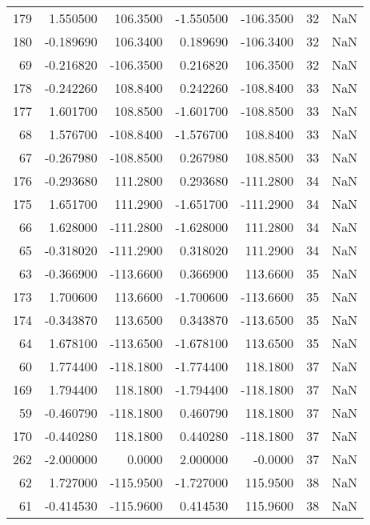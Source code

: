 \begin{tabular}{rrrrrrr}
179 &    1.550500 &  106.3500 &   -1.550500 &   -106.3500 &          32 & NaN \\
180 &   -0.189690 &  106.3400 &    0.189690 &   -106.3400 &          32 & NaN \\
 69 &   -0.216820 & -106.3500 &    0.216820 &    106.3500 &          32 & NaN \\
178 &   -0.242260 &  108.8400 &    0.242260 &   -108.8400 &          33 & NaN \\
177 &    1.601700 &  108.8500 &   -1.601700 &   -108.8500 &          33 & NaN \\
 68 &    1.576700 & -108.8400 &   -1.576700 &    108.8400 &          33 & NaN \\
 67 &   -0.267980 & -108.8500 &    0.267980 &    108.8500 &          33 & NaN \\
176 &   -0.293680 &  111.2800 &    0.293680 &   -111.2800 &          34 & NaN \\
175 &    1.651700 &  111.2900 &   -1.651700 &   -111.2900 &          34 & NaN \\
 66 &    1.628000 & -111.2800 &   -1.628000 &    111.2800 &          34 & NaN \\
 65 &   -0.318020 & -111.2900 &    0.318020 &    111.2900 &          34 & NaN \\
 63 &   -0.366900 & -113.6600 &    0.366900 &    113.6600 &          35 & NaN \\
173 &    1.700600 &  113.6600 &   -1.700600 &   -113.6600 &          35 & NaN \\
174 &   -0.343870 &  113.6500 &    0.343870 &   -113.6500 &          35 & NaN \\
 64 &    1.678100 & -113.6500 &   -1.678100 &    113.6500 &          35 & NaN \\
 60 &    1.774400 & -118.1800 &   -1.774400 &    118.1800 &          37 & NaN \\
169 &    1.794400 &  118.1800 &   -1.794400 &   -118.1800 &          37 & NaN \\
 59 &   -0.460790 & -118.1800 &    0.460790 &    118.1800 &          37 & NaN \\
170 &   -0.440280 &  118.1800 &    0.440280 &   -118.1800 &          37 & NaN \\
262 &   -2.000000 &    0.0000 &    2.000000 &     -0.0000 &          37 & NaN \\
 62 &    1.727000 & -115.9500 &   -1.727000 &    115.9500 &          38 & NaN \\
 61 &   -0.414530 & -115.9600 &    0.414530 &    115.9600 &          38 & NaN \\

\end{tabular}
